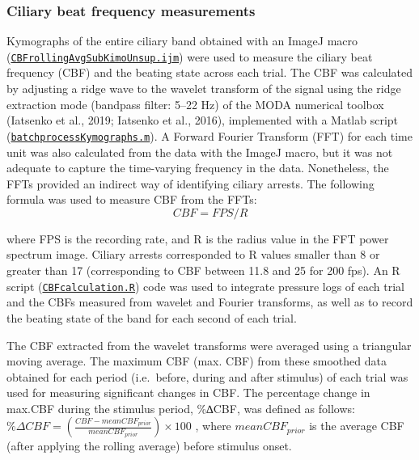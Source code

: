 \documentclass[
  11pt,
]{article}
\begin{document}
\subsubsection{Ciliary beat frequency
measurements}\label{ciliary-beat-frequency-measurements}

Kymographs of the entire ciliary band obtained with an ImageJ macro
(\href{https://github.com/JekelyLab/Bezares_et_al_2023_Pressure/blob/main/Code/CBFmeasurement/CBFrollingAvgSubKimoUnsup.ijm}{\texttt{CBFrollingAvgSubKimoUnsup.ijm}})
were used to measure the ciliary beat frequency (CBF) and the beating
state across each trial. The CBF was calculated by adjusting a ridge
wave to the wavelet transform of the signal using the ridge extraction
mode (bandpass filter: 5--22 Hz) of the MODA numerical toolbox (Iatsenko
et al., 2019; Iatsenko et al., 2016), implemented with a Matlab script
(\href{https://github.com/JekelyLab/Bezares_et_al_2023_Pressure/blob/main/Code/CBFmeasurement/batchprocessKymographs.m}{\texttt{batchprocessKymographs.m}}).
A Forward Fourier Transform (FFT) for each time unit was also calculated
from the data with the ImageJ macro, but it was not adequate to capture
the time-varying frequency in the data. Nonetheless, the FFTs provided
an indirect way of identifying ciliary arrests. The following formula
was used to measure CBF from the FFTs: \[ CBF=FPS/R \]

where FPS is the recording rate, and R is the radius value in the FFT
power spectrum image. Ciliary arrests corresponded to R values smaller
than 8 or greater than 17 (corresponding to CBF between 11.8 and 25 for
200 fps). An R script
(\href{https://github.com/JekelyLab/Bezares_et_al_2023_Pressure/blob/main/Code/CBFmeasurement/CBFcalculation.R}{\texttt{CBFcalculation.R}})
code was used to integrate pressure logs of each trial and the CBFs
measured from wavelet and Fourier transforms, as well as to record the
beating state of the band for each second of each trial.

The CBF extracted from the wavelet transforms were averaged using a
triangular moving average. The maximum CBF (max. CBF) from these
smoothed data obtained for each period (i.e.~before, during and after
stimulus) of each trial was used for measuring significant changes in
CBF. The percentage change in max.CBF during the stimulus period,
\%∆CBF, was defined as follows:
\(\%\Delta CBF= (\frac{CBF - meanCBF_{prior}}{meanCBF_{prior}})\times 100\)
, where \(meanCBF_{prior}\) is the average CBF (after applying the
rolling average) before stimulus onset.
\end{document}
